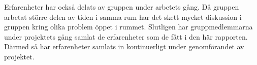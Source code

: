 Erfarenheter har också delats av gruppen under arbetets gång. Då gruppen arbetat större delen av tiden i samma rum har det skett mycket diskussion i gruppen kring olika problem öppet i rummet. Slutligen har gruppmedlemmarna under projektets gång samlat de erfarenheter som de fått i den här rapporten. Därmed så har erfarenheter samlats in kontinuerligt under genomförandet av projektet.


